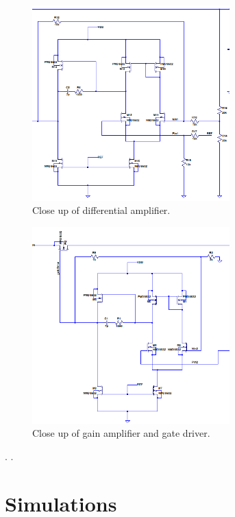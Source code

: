 \documentclass[10pt]{amsart}
\begin{document}
\begin{figure}[h]
	\begin{center}
		\includegraphics[width=3in]{Media/diff.png}
	\end{center}
	\caption{Close up of differential amplifier.}
	\label{fig:pidfb}
\end{figure}

\begin{figure}[h]
	\begin{center}
		\includegraphics[width=3in]{Media/driver.png}
	\end{center}
	\caption{Close up of gain amplifier and gate driver.}
	\label{fig:pidfb}
\end{figure}

.
\newpage
.
  
\section{Simulations}
\end{document}
